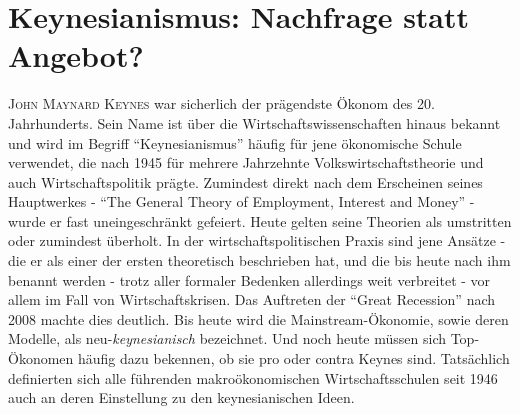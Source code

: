 %
%
%

\chapter{Keynesianismus: Nachfrage statt Angebot?}
\label{Keynes}

\textsc{John Maynard Keynes} war sicherlich der prägendste Ökonom des 20. Jahrhunderts. Sein Name ist über die Wirtschaftswissenschaften hinaus bekannt und wird im Begriff "`Keynesianismus"' häufig für jene ökonomische Schule verwendet, die nach 1945 für mehrere Jahrzehnte Volkswirtschaftstheorie und auch Wirtschaftspolitik prägte. Zumindest direkt nach dem Erscheinen seines Hauptwerkes -  "`The General Theory	of Employment, Interest and Money"' - wurde er fast uneingeschränkt gefeiert. Heute gelten seine Theorien als umstritten oder zumindest überholt. In der wirtschaftspolitischen Praxis sind jene Ansätze - die er als einer der ersten theoretisch beschrieben hat, und die bis heute nach ihm benannt werden - trotz aller formaler Bedenken allerdings weit verbreitet - vor allem im Fall von Wirtschaftskrisen. Das Auftreten der "`Great Recession"' nach 2008 machte dies deutlich. Bis heute wird die Mainstream-Ökonomie, sowie deren Modelle, als neu-\textit{keynesianisch} bezeichnet. Und noch heute müssen sich Top-Ökonomen häufig dazu bekennen, ob sie pro oder contra Keynes sind. Tatsächlich definierten sich alle führenden makroökonomischen Wirtschaftsschulen seit 1946 auch an deren Einstellung zu den keynesianischen Ideen.
